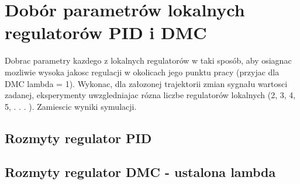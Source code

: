 \section{Dobór parametrów lokalnych regulatorów PID i DMC}
\label{projekt:zad6}

Dobrac parametry kazdego z lokalnych regulatorów w taki sposób, aby osiagnac mozliwie
wysoka jakosc regulacji w okolicach jego punktu pracy (przyjac dla DMC lambda = 1).
Wykonac, dla załozonej trajektorii zmian sygnału wartosci zadanej, eksperymenty
uwzgledniajac rózna liczbe regulatorów lokalnych (2, 3, 4, 5, . . . ). Zamiescic wyniki
symulacji.

%    


\subsection{Rozmyty regulator PID}
\label{projekt:zad6:PID}



\newpage

\subsection{Rozmyty regulator DMC - ustalona lambda}
\label{projekt:zad6:DMC}



\newpage
